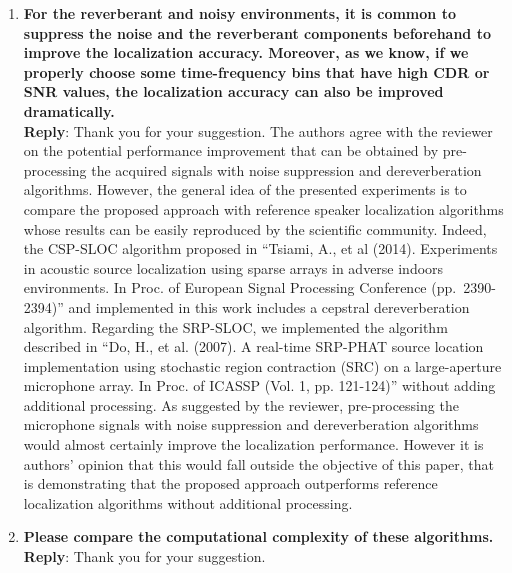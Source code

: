 \documentclass[11pt, technote, letterpaper, oneside, onecolumn]{IEEEtran}
\begin{document}
\begin{enumerate}
\item  \textbf{For the reverberant and noisy environments, it is common to suppress the noise and the reverberant components beforehand to improve the localization accuracy. Moreover, as we know, if we properly choose some time-frequency bins that have high CDR or SNR values, the localization accuracy can also be improved dramatically.\\}
\textbf{Reply}: Thank you for your suggestion. The authors agree with the reviewer on the potential performance improvement that can be obtained by pre-processing the acquired signals with noise suppression and dereverberation algorithms. However, the general idea of the presented experiments is to compare the proposed approach with reference speaker localization algorithms whose results can be easily reproduced by the scientific community. Indeed, the CSP-SLOC algorithm proposed in  ``Tsiami, A., et al (2014). Experiments in acoustic source localization using sparse arrays in adverse indoors environments. In Proc. of European Signal Processing Conference (pp.\ 2390-2394)'' and implemented in this work includes a cepstral dereverberation algorithm. Regarding the SRP-SLOC, we implemented the algorithm described in ``Do, H., et al. (2007). A real-time SRP-PHAT source location implementation using stochastic region contraction (SRC) on a large-aperture microphone array. In Proc. of ICASSP (Vol. 1, pp. 121-124)'' without adding additional processing. As suggested by the reviewer, pre-processing the microphone signals with noise suppression and dereverberation algorithms would almost certainly improve the localization performance. However it is authors' opinion that this would fall outside the objective of this paper, that is demonstrating that the proposed approach outperforms reference localization algorithms without additional processing.  %


\item  \textbf{Please compare the computational complexity of these algorithms.\\}
\textbf{Reply}: Thank you for your suggestion.

\end{enumerate}
\end{document}
